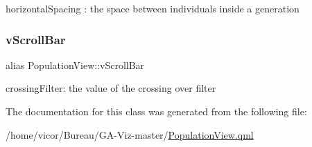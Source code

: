 horizontal\+Spacing \+: the space between individuals inside a generation \mbox{\label{class_population_view_a861743ff60207556fdb76b7cb8f9f8fe}} 
\subsubsection{\texorpdfstring{v\+Scroll\+Bar}{vScrollBar}}
{\footnotesize\ttfamily alias Population\+View\+::v\+Scroll\+Bar}

crossing\+Filter\+: the value of the crossing over filter 

The documentation for this class was generated from the following file\+:\begin{DoxyCompactItemize}
\item 
/home/vicor/\+Bureau/\+G\+A-\/\+Viz-\/master/\hyperlink{_population_view_8qml}{Population\+View.\+qml}\end{DoxyCompactItemize}
